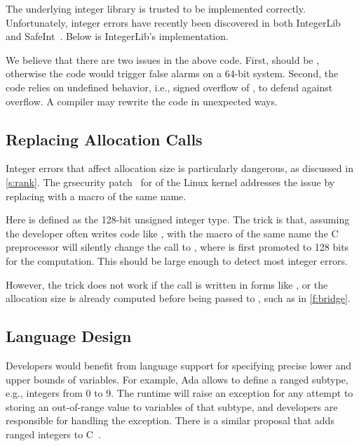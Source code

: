 The underlying integer library is trusted to be implemented
correctly.  Unfortunately, integer errors have recently been
discovered in both IntegerLib and SafeInt~\cite{ioc}.
Below is IntegerLib's  implementation.
%

We believe that there are two issues in the above code.
%
First,  should be , otherwise
the code would trigger false alarms on a 64-bit system.  Second,
the code relies on undefined behavior, i.e., signed overflow of
, to defend against overflow.  A compiler may rewrite
the code in unexpected ways.


\subsection{Replacing Allocation Calls}

Integer errors that affect allocation size is particularly dangerous,
as discussed in \autoref{s:rank}.  The grsecurity patch~\cite{grsecurity}
for of the Linux kernel addresses the issue by replacing
 with a macro of the same name.
%

%
Here  is defined as the 128-bit unsigned integer
type.  The trick is that, assuming the developer often writes code
like , with the macro of the same name
the C preprocessor will silently change the call to
, where  is first
promoted to 128 bits for the computation.  This should be large
enough to detect most integer errors.

However, the trick does not work if the call is written in forms
like , or the allocation
size is already computed before being passed to , such
as in \autoref{f:bridge}.


\subsection{Language Design}

Developers would benefit from language support for specifying precise
lower and upper bounds of variables.  For example, Ada allows to
define a ranged subtype, e.g., integers from 0 to 9.  The runtime
will raise an exception for any attempt to storing an out-of-range
value to variables of that subtype, and developers are responsible
for handling the exception.  There is a similar proposal that adds
ranged integers to C~\cite{ranged-c}.

